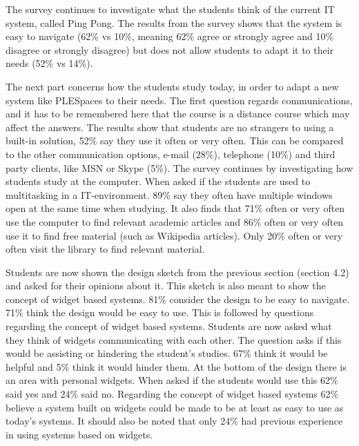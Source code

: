 The survey continues to investigate what the students think of the current IT system, called Ping Pong. The results from the survey shows that the system is easy to navigate (62\% vs 10\%, meaning 62\% agree or strongly agree and 10\% disagree or strongly disagree) but does not allow students to adapt it to their needs (52\% vs 14\%).

The next part concerns how the students study today, in order to adapt a new system like PLESpaces to their needs. The first question regards communications, and it has to be remembered here that the course is a distance course which may affect the answers. The results show that students are no strangers to using a built-in solution, 52\% say they use it often or very often. This can be compared to the other communication options, e-mail (28\%), telephone (10\%) and third party clients, like MSN or Skype (5\%). 
The survey continues by investigating how students study at the computer. When asked if the students are used to multitasking in a IT-environment. 89\% say they often have multiple windows open at the same time when studying. It also finds that 71\% often or very often use the computer to find relevant academic articles and 86\% often or very often use it to find free material (such as Wikipedia articles). Only 20\% often or very often visit the library to find relevant material.

Students are now shown the design sketch from the previous section (section 4.2) and asked for their opinions about it. This sketch is also meant to show the concept of widget based systems.
81\% consider the design to be easy to navigate. 71\% think the design would be easy to use.
This is followed by questions regarding the concept of widget based systems. Students are now asked what they think of widgets communicating with each other. The question asks if this would be assisting or hindering the student's studies. 67\% think it would be helpful and 5\% think it would hinder them. At the bottom of the design there is an area with personal widgets. When asked if the students would use this 62\% said yes and 24\% said no. Regarding the concept of widget based systems 62\% believe a system built on widgets could be made to be at least as easy to use as today's systems. It should also be noted that only 24\% had previous experience in using systems based on widgets.

